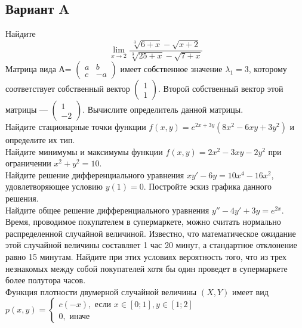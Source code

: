 \documentclass[addpoints, answers]{exam} %
\begin{document}
\subsection{Вариант A}
\begin{questions}

\question Найдите 
\[
\lim_{x \to 2}\frac{\sqrt[3]{6+x}-\sqrt{x+2}}{\sqrt[3]{25+x}-\sqrt{7+x}}
\]
\question Матрица вида А=
$\left( \begin{array}{cc}
a & b\\
c & -a
\end{array} \right)$ 
имеет собственное значение $\lambda_1=3$, которому соответствует собственный вектор 
$\left( \begin{array}{c}
1\\
1
\end{array} \right).$ Второй собственный вектор этой матрицы --- 
$\left( \begin{array}{c}
1\\
-2
\end{array} \right).$ 
Вычислите определитель данной матрицы.\\
\question Найдите стационарные точки функции $f(x,y)=e^{2x+3y}(8x^2-6xy+3y^2)$ и определите их тип.\\
\question Найдите минимумы и максимумы функции $f(x,y)=2x^2-3xy-2y^2$ при ограничении $x^2+y^2=10$.\\
\question Найдите решение дифференциального уравнения $xy'-6y=10x^4-16x^2$, удовлетворяющее условию $y(1)=0$. Постройте эскиз графика данного решения. \\
\question Найдите общее решение дифференциального уравнения $y''-4y'+3y=e^{2x}$.\\
\question Время, проводимое покупателем в супермаркете, можно считать нормально распределенной случайной величиной. Известно, что математическое ожидание этой случайной величины составляет 1 час 20 минут, а стандартное отклонение равно 15 минутам. Найдите при этих условиях вероятность того, что из трех незнакомых между собой покупателей хотя бы один проведет в супермаркете более полутора часов.\\
\question Функция плотности двумерной случайной величины $(X,Y)$ имеет вид\\
$p(x,y)=\begin{cases}
c(-x),\text{ если } x\in [0;1],y \in [1;2]\\
0,\text{ иначе }
\end{cases}$\\


\end{questions}
\end{document}
